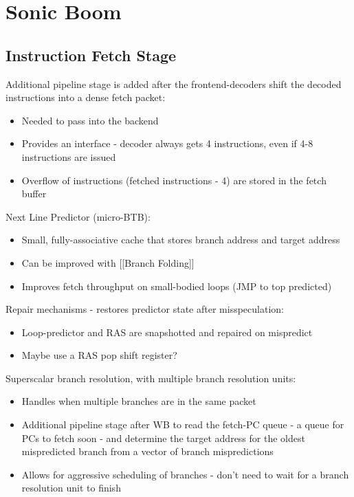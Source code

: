 \documentclass[a4paper, 5pt, twocolumn]{article}
\begin{document}
\section{Sonic Boom}
\hypertarget{instructionfetchstage}{%
\subsection{Instruction Fetch Stage}\label{instructionfetchstage}}

Additional pipeline stage is added after the frontend-decoders shift the decoded instructions into a dense fetch packet:
\begin{itemize}[topsep=0pt,itemsep=-1ex,partopsep=1ex,parsep=1ex]
	\item Needed to pass into the backend
	\item Provides an interface - decoder always gets 4 instructions, even if 4-8 instructions are issued
	\item Overflow of instructions (fetched instructions - 4) are stored in the fetch buffer \\
\end{itemize}

Next Line Predictor (micro-BTB):
\begin{itemize}[topsep=0pt,itemsep=-1ex,partopsep=1ex,parsep=1ex]
	\item Small, fully-associative cache that stores branch address and target address
	\item Can be improved with [[Branch Folding]]
	\item Improves fetch throughput on small-bodied loops (JMP to top predicted) \\
\end{itemize}

Repair mechanisms - restores predictor state after misspeculation:

\begin{itemize}[topsep=0pt,itemsep=-1ex,partopsep=1ex,parsep=1ex]
	\item Loop-predictor and RAS are snapshotted and repaired on mispredict
	\item Maybe use a RAS pop shift register? \\
\end{itemize}

Superscalar branch resolution, with multiple branch resolution units:

\begin{itemize}[topsep=0pt,itemsep=-1ex,partopsep=1ex,parsep=1ex]
 \item Handles when multiple branches are in the same packet
 \item Additional pipeline stage after WB to read the fetch-PC queue - a queue for PCs to fetch soon - and determine the target address for the oldest mispredicted branch from a vector of branch mispredictions
 \item Allows for aggressive scheduling of branches - don't need to wait for a branch resolution unit to finish \\
\end{itemize}
\end{document}
